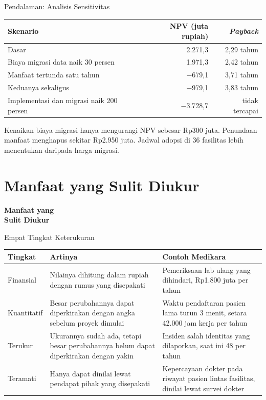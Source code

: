 \documentclass[aspectratio=169, table, 12pt]{beamer}
\begin{document}
\begin{frame}{{\Large Pendalaman: Analisis Sensitivitas}}
  \footnotesize
  \begin{tabularx}{\textwidth}{Xrr}
    \hline
    \textbf{Skenario} & \textbf{NPV (juta rupiah)} & \textbf{\textit{Payback}} \\
    \hline
    Dasar & 2.271,3 & 2,29 tahun \\
    \hline
    Biaya migrasi data naik 30 persen & 1.971,3 & 2,42 tahun \\
    \hline
    Manfaat tertunda satu tahun & $-$679,1 & 3,71 tahun \\
    \hline
    Keduanya sekaligus & $-$979,1 & 3,83 tahun \\
    \hline
    Implementasi dan migrasi naik 200 persen & $-$3.728,7 & tidak tercapai \\
    \hline
  \end{tabularx}

  \vspace{6pt}
  \small Kenaikan biaya migrasi hanya mengurangi NPV sebesar Rp300 juta. Penundaan manfaat menghapus
  sekitar Rp2.950 juta. Jadwal adopsi di 36 fasilitas lebih menentukan daripada harga migrasi.
\end{frame}

\section{Manfaat yang Sulit Diukur}

\begin{frame}{\hfill}
  \centering
  \Huge{\textbf{Manfaat yang\\Sulit Diukur}}
\end{frame}

\begin{frame}{{\Large Empat Tingkat Keterukuran}}
  \footnotesize
  \begin{tabularx}{\textwidth}{L{1.8cm}YY}
    \hline
    \textbf{Tingkat} & \textbf{Artinya} & \textbf{Contoh Medikara} \\
    \hline
    Finansial & Nilainya dihitung dalam rupiah dengan rumus yang disepakati &
      Pemeriksaan lab ulang yang dihindari, Rp1.800 juta per tahun \\
    \hline
    Kuantitatif & Besar perubahannya dapat diperkirakan dengan angka sebelum
      proyek dimulai & Waktu pendaftaran pasien lama turun 3 menit, setara
      42.000 jam kerja per tahun \\
    \hline
    Terukur & Ukurannya sudah ada, tetapi besar perubahannya belum dapat
      diperkirakan dengan yakin & Insiden salah identitas yang dilaporkan,
      saat ini 48 per tahun \\
    \hline
    Teramati & Hanya dapat dinilai lewat pendapat pihak yang disepakati &
      Kepercayaan dokter pada riwayat pasien lintas fasilitas, dinilai lewat
      survei dokter \\
    \hline
  \end{tabularx}
\end{frame}
\end{document}
